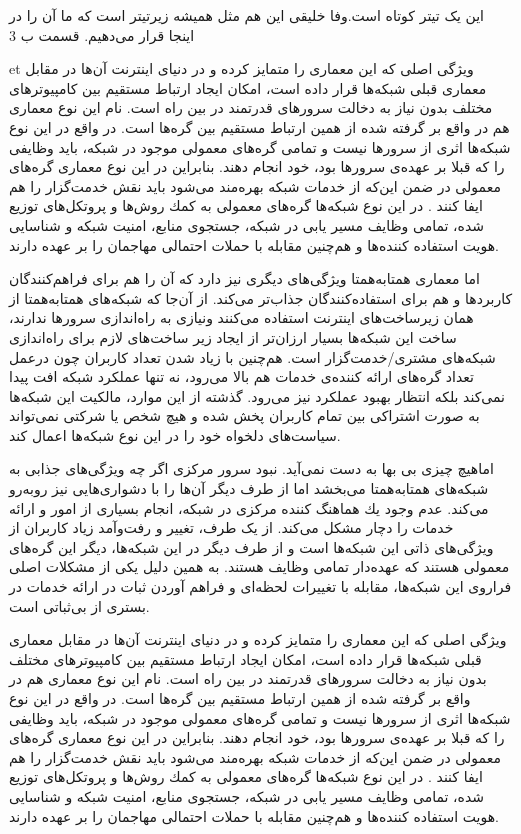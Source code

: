 \documentclass[12pt,twoside]{xepersian-magazine}
\begin{document}
\begin{article}{2}
	{این یک تیتر کوتاه است.وفا خلیقی}
	{این هم مثل همیشه زیرتیتر است که ما آن را در اینجا قرار می‌دهیم.}
	{قسمت ب}
	{3}




\noindent{}  et ويژگی اصلی که اين معماری را متمايز کرده و در دنيای اينترنت آن‌ها در مقابل معماری قبلی شبكه‌ها قرار داده است، امكان ايجاد ارتباط مستقيم  بين كامپيوترهای مختلف بدون نياز به دخالت سرورهای قدرتمند در بين راه است.  نام‌ اين نوع معماری هم در واقع بر گرفته شده از همین  ارتباط مستقیم بين گره‌ها است.  در واقع در اين نوع شبكه‌ها اثری از سرورها نيست و تمامی گره‌های معمولی موجود در شبكه، بايد وظايفی را که قبلا بر عهده‌ی سرورها بود، خود انجام دهند. بنابراين در اين نوع معماری گره‌های معمولی در ضمن اين‌که از خدمات شبکه بهره‌مند می‌شود بايد نقش خدمت‌گزار را هم ايفا کنند . در اين نوع شبکه‌ها گره‌های معمولی به كمك روش‌ها و پروتكل‌های توزيع شده، تمامی وظايف  مسير يابی در شبكه، جستجوی منابع، امنيت شبكه و شناسايی هويت استفاده كننده‌ها و هم‌چنين مقابله با حملات احتمالی مهاجمان را بر عهده دارند.

اما معماری همتابه‌همتا ويژگی‌های ديگری نيز دارد که آن را هم برای فراهم‌کنندگان کاربردها و هم برای استفاده‌کنندگان جذاب‌تر می‌کند.  از آن‌جا که شبکه‌های همتابه‌همتا از همان زيرساخت‌های اينترنت استفاده می‌کنند ونيازی به راه‌اندازی سرورها ندارند، ساخت اين شبكه‌ها بسيار ارزان‌تر از ايجاد زير ساخت‌های لازم برای راه‌اندازی شبكه‌های مشتری/خدمت‌گزار است.  هم‌چنين با زياد شدن تعداد کاربران چون درعمل تعداد گره‌های ارائه کننده‌ی خدمات هم بالا می‌رود، نه تنها عملكرد شبكه افت پيدا نمی‌كند بلكه انتظار بهبود عملکرد نيز می‌رود. گذشته از اين موارد، مالكيت اين شبكه‌ها به صورت اشتراكی بين تمام کاربران پخش شده و هيچ شخص يا شركتی نمی‌تواند سياست‌های دلخواه خود را در اين نوع شبكه‌ها اعمال کند.

اماهيچ چيزی بی‌ بها به دست نمی‌آید. نبود سرور مرکزی اگر چه  ويژگی‌های جذابی به شبکه‌های همتابه‌همتا می‌بخشد اما از طرف ديگر آن‌ها را با دشواری‌هايی نيز روبه‌رو می‌کند.  عدم وجود يك هماهنگ كننده مركزی در شبكه، انجام بسياری از امور و ارائه خدمات را  دچار مشكل می‌کند.  از يک طرف، تغيير و رفت‌وآمد زیاد کاربران از ويژگی‌های ذاتی اين شبکه‌ها است و از طرف ديگر در اين شبكه‌ها، ديگر اين گره‌های معمولی  هستند كه  عهده‌دار تمامی وظايف هستند. به همين دلیل يکی از مشکلات اصلی فراروی اين شبكه‌ها، مقابله با  تغييرات لحظه‌ای و فراهم آوردن ثبات در ارائه  خدمات در بستری از بی‌ثباتی است.  

ويژگی اصلی که اين معماری را متمايز کرده و در دنيای اينترنت آن‌ها در مقابل معماری قبلی شبكه‌ها قرار داده است، امكان ايجاد ارتباط مستقيم  بين كامپيوترهای مختلف بدون نياز به دخالت سرورهای قدرتمند در بين راه است.  نام‌ اين نوع معماری هم در واقع بر گرفته شده از همین  ارتباط مستقیم بين گره‌ها است.  در واقع در اين نوع شبكه‌ها اثری از سرورها نيست و تمامی گره‌های معمولی موجود در شبكه، بايد وظايفی را که قبلا بر عهده‌ی سرورها بود، خود انجام دهند. بنابراين در اين نوع معماری گره‌های معمولی در ضمن اين‌که از خدمات شبکه بهره‌مند می‌شود بايد نقش خدمت‌گزار را هم ايفا کنند . در اين نوع شبکه‌ها گره‌های معمولی به كمك روش‌ها و پروتكل‌های توزيع شده، تمامی وظايف  مسير يابی در شبكه، جستجوی منابع، امنيت شبكه و شناسايی هويت استفاده كننده‌ها و هم‌چنين مقابله با حملات احتمالی مهاجمان را بر عهده دارند.


\end{article}
\end{document}
